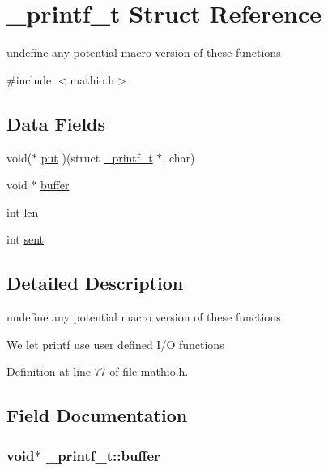 \hypertarget{struct__printf__t}{}\section{\+\_\+printf\+\_\+t Struct Reference}
\label{struct__printf__t}


undefine any potential macro version of these functions  




{\ttfamily \#include $<$mathio.\+h$>$}

\subsection*{Data Fields}
\begin{DoxyCompactItemize}
\item 
void($\ast$ \hyperlink{struct__printf__t_a3ef8eb0143b93d4446b04c6ce9313be7}{put} )(struct \hyperlink{struct__printf__t}{\+\_\+printf\+\_\+t} $\ast$, char)
\item 
void $\ast$ \hyperlink{struct__printf__t_ad35884151d0be6667caafad8caacc76f}{buffer}
\item 
int \hyperlink{struct__printf__t_a5139902cde74159b79e6418a34712bee}{len}
\item 
int \hyperlink{struct__printf__t_a872716fd701166cd57bd3fffb7b77706}{sent}
\end{DoxyCompactItemize}


\subsection{Detailed Description}
undefine any potential macro version of these functions 

We let printf use user defined I/O functions 

Definition at line 77 of file mathio.\+h.



\subsection{Field Documentation}
\subsubsection[{\texorpdfstring{buffer}{buffer}}]{\setlength{\rightskip}{0pt plus 5cm}void$\ast$ \+\_\+printf\+\_\+t\+::buffer}\hypertarget{struct__printf__t_ad35884151d0be6667caafad8caacc76f}{}\label{struct__printf__t_ad35884151d0be6667caafad8caacc76f}


